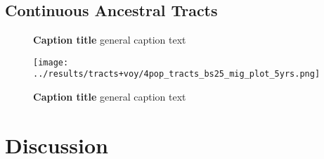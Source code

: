 \documentclass[11pt]{article}
\begin{document}
\subsection{Continuous Ancestral Tracts}



\begin{figure}[htb!]%
    \centering
    \vspace*{-1em}
        \caption{\textbf{
            Caption title
        }
            general caption text
        }
\end{figure}



\begin{figure}[htb!]%
    \centering
    \texttt{[image: 
        ../results/tracts+voy/4pop\_tracts\_bs25\_mig\_plot\_5yrs.png]} 
    \caption{\textbf{
        Caption title
    }
        general caption text
    }
\end{figure}








\section{Discussion}


\end{document}

